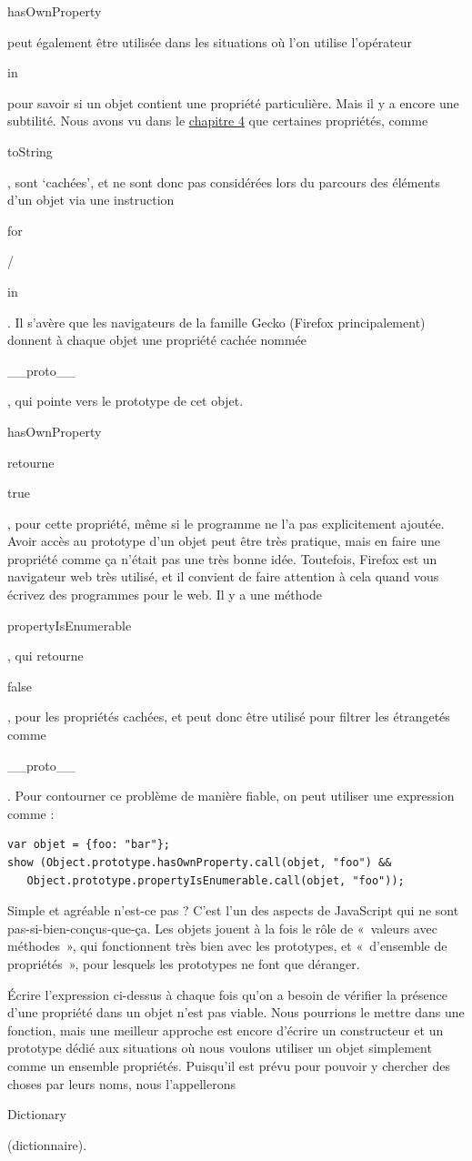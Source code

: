 \documentclass{FramateX}
\renewcommand{\texttt}[1]{\begin{sffamily}{#1}\end{sffamily}}
\begin{document}
\texttt{hasOwnProperty} peut également être utilisée dans les situations
où l'on utilise l'opérateur \texttt{in} pour savoir si un objet contient
une propriété particulière. Mais il y a encore une subtilité. Nous avons
vu dans le \href{chapter4.html}{chapitre 4} que certaines propriétés,
comme \texttt{toString}, sont `cachées', et ne sont donc pas considérées
lors du parcours des éléments d'un objet via une instruction
\texttt{for}/\texttt{in}. Il s'avère que les navigateurs de la famille
Gecko (Firefox principalement) donnent à chaque objet une propriété
cachée nommée \texttt{\_\_proto\_\_}, qui pointe vers le prototype de
cet objet. \texttt{hasOwnProperty} retourne \texttt{true}, pour cette
propriété, même si le programme ne l'a pas explicitement ajoutée. Avoir
accès au prototype d'un objet peut être très pratique, mais en faire une
propriété comme ça n'était pas une très bonne idée. Toutefois, Firefox
est un navigateur web très utilisé, et il convient de faire attention à
cela quand vous écrivez des programmes pour le web. Il y a une méthode
\texttt{propertyIsEnumerable}, qui retourne \texttt{false}, pour les
propriétés cachées, et peut donc être utilisé pour filtrer les
étrangetés comme \texttt{\_\_proto\_\_}. Pour contourner ce problème de
manière fiable, on peut utiliser une expression comme :

\begin{lstlisting}
var objet = {foo: "bar"};
show (Object.prototype.hasOwnProperty.call(objet, "foo") &&
   Object.prototype.propertyIsEnumerable.call(objet, "foo"));
\end{lstlisting}
Simple et agréable n'est-ce pas ? C'est l'un des aspects de JavaScript
qui ne sont pas-si-bien-conçus-que-ça. Les objets jouent à la fois le
rôle de «~valeurs avec méthodes~», qui fonctionnent très bien avec les
prototypes, et «~d'ensemble de propriétés~», pour lesquels les
prototypes ne font que déranger.

\begin{center}\end{center}

Écrire l'expression ci-dessus à chaque fois qu'on a besoin de vérifier
la présence d'une propriété dans un objet n'est pas viable. Nous
pourrions le mettre dans une fonction, mais une meilleur approche est
encore d'écrire un constructeur et un prototype dédié aux situations où
nous voulons utiliser un objet simplement comme un ensemble propriétés.
Puisqu'il est prévu pour pouvoir y chercher des choses par leurs noms,
nous l'appellerons \texttt{Dictionary} (dictionnaire).
\end{document}
